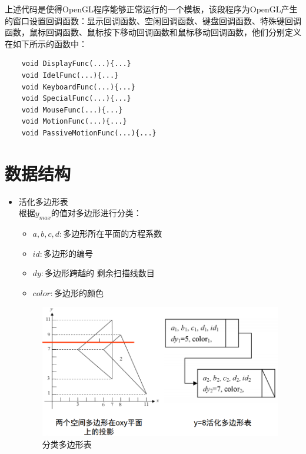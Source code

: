 \documentclass[10pt]{article}
\begin{document}
上述代码是使得OpenGL程序能够正常运行的一个模板，该段程序为OpenGL产生的窗口设置回调函数：显示回调函数、空闲回调函数、键盘回调函数、特殊键回调函数，鼠标回调函数、鼠标按下移动回调函数和鼠标移动回调函数，他们分别定义在如下所示的函数中：
\begin{lstlisting}
	void DisplayFunc(...){...}
	void IdelFunc(...){...}
	void KeyboardFunc(...){...}
	void SpecialFunc(...){...}
	void MouseFunc(...){...}
	void MotionFunc(...){...}
	void PassiveMotionFunc(...){...}
\end{lstlisting}

\section{数据结构}
\begin{itemize}
\item{活化多边形表} \\
根据$y_{max}$的值对多边形进行分类：
\begin{itemize}
\item{$a,b,c,d:$多边形所在平面的方程系数}
\item{$id:$多边形的编号}
\item{$dy:$多边形跨越的{\color{red} 剩余}扫描线数目}
\item{$color:$多边形的颜色}
\end{itemize}
\begin{figure}[H]
\begin{center}
\includegraphics[scale=0.4]{structure1.png}
\end{center}
\caption{分类多边形表}
\end{figure}


\end{itemize}
\end{document}

